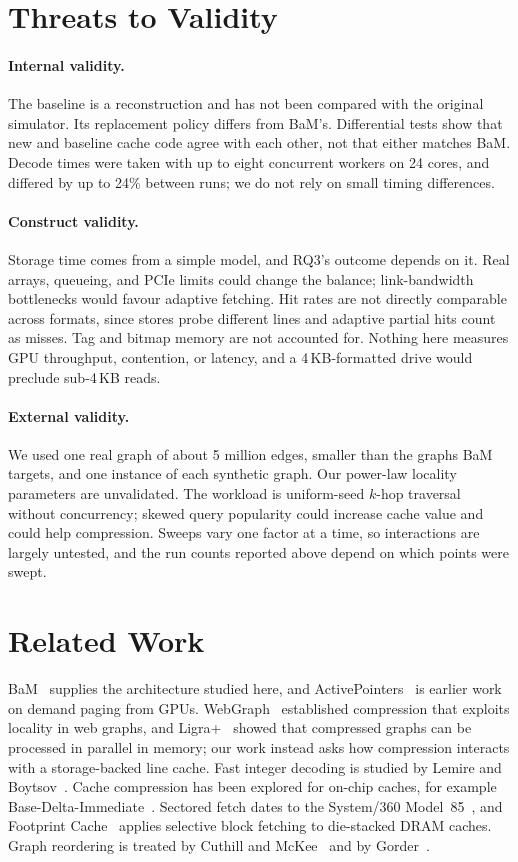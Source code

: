 \documentclass[sigconf,nonacm]{acmart}
\begin{document}
\section{Threats to Validity}
\paragraph{Internal validity.}
The baseline is a reconstruction and has not been compared with the original simulator. Its replacement policy differs from BaM's. Differential tests show that new and baseline cache code agree with each other, not that either
matches BaM. Decode times were taken with up to eight concurrent workers on 24 cores, and differed by up to 24\% between runs; we do not rely on small timing differences.

\paragraph{Construct validity.}
Storage time comes from a simple model, and RQ3's outcome depends on it. Real arrays, queueing, and PCIe limits could change the balance; link-bandwidth bottlenecks would favour adaptive fetching.
Hit rates are not directly comparable across formats, since stores probe different lines and adaptive partial hits count as misses. Tag and bitmap memory are not accounted for. Nothing here measures GPU throughput, contention, or latency, and a 4\,KB-formatted drive would preclude sub-4\,KB reads.

\paragraph{External validity.}
We used one real graph of about 5 million edges, smaller than the graphs BaM targets, and one instance of each synthetic graph. Our power-law locality parameters are unvalidated. The workload is uniform-seed $k$-hop traversal without concurrency; skewed query popularity could increase cache value and could help compression.
Sweeps vary one factor at a time, so interactions are largely untested, and the run counts reported above depend on which points were swept.

\section{Related Work}
BaM~\cite{bam} supplies the architecture studied here, and ActivePointers~\cite{activepointers} is earlier work on demand paging from GPUs. WebGraph~\cite{webgraph} established compression that exploits locality in web graphs, and Ligra+~\cite{ligraplus} showed that compressed graphs can be processed in parallel in memory; our work instead asks how compression interacts with a storage-backed
line cache. Fast integer decoding is studied by Lemire and Boytsov~\cite{lemire}. Cache compression has been explored for on-chip caches, for example Base-Delta-Immediate~\cite{bdi}. Sectored fetch dates to the System/360 Model~85~\cite{liptay}, and Footprint Cache~\cite{footprint} applies selective block fetching to die-stacked DRAM caches. Graph reordering is treated by Cuthill and McKee~\cite{cuthill} and by Gorder~\cite{gorder}.
\end{document}
